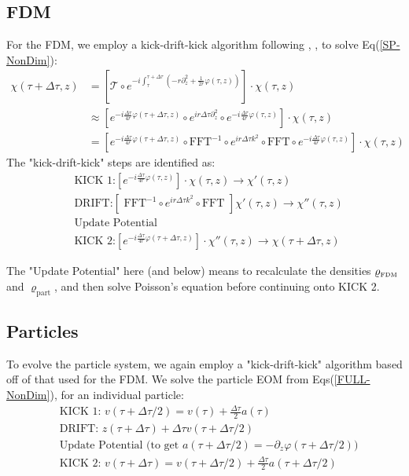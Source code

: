 \documentclass{book}
\newcommand{\pd}{\partial}
\begin{document}
\subsection{FDM}
For the FDM, we employ a kick-drift-kick algorithm following \cite{Edwards_2018}, \cite{May&Springel_2021}, to solve Eq(\ref{SP-NonDim}):
\begin{align}
    \chi(\tau+\Delta \tau,z) & = \left[\mathcal{T} \circ e^{-i \int_\tau^{\tau+\Delta\tau} \left(-r \pd_z^2 + \frac{1}{2r}\varphi(\tau,z)\right) } \right]\cdot \chi(\tau,z) \\
    &  \approx  \left[ e^{-i\frac{\Delta\tau}{4r}\varphi(\tau+\Delta\tau,z)} \circ e^{ir\Delta\tau \pd_z^2}\circ e^{-i\frac{\Delta\tau}{4r}\varphi(\tau,z)} \right] \cdot \chi(\tau,z)\\
    & = \left[e^{-i\frac{\Delta\tau}{4r}\varphi(\tau+\Delta\tau,z)} \circ \text{FFT}^{-1}\circ e^{ir\Delta\tau k^2}\circ \text{FFT}\circ e^{-i\frac{\Delta\tau}{4r}\varphi(\tau,z)} \right] \cdot \chi(\tau,z)
\end{align}
The "kick-drift-kick" steps are identified as:
\begin{align*}
    & \text{KICK 1:}  \left[ e^{-i\frac{\Delta\tau}{4r}\varphi(\tau,z)}\right] \cdot \chi(\tau,z) \rightarrow \chi'(\tau,z) \\
    &\text{DRIFT:}  \left[\text{ FFT}^{-1}\circ e^{ir\Delta\tau k^2}\circ \text{FFT } \right] \chi'(\tau,z) \rightarrow \chi''(\tau,z) \\
    &\text{Update Potential} \\
    &\text{KICK 2:}  \left[e^{-i\frac{\Delta\tau}{4r}\varphi(\tau+\Delta\tau,z)} \right]\cdot \chi''(\tau,z) \rightarrow \chi(\tau+\Delta\tau,z)
\end{align*}

The "Update Potential" here (and below) means to recalculate the densities $\varrho_\text{\tiny{FDM}}$ and $\varrho_\text{part}$, and then solve Poisson's equation before continuing onto KICK 2.
\subsection{Particles} To evolve the particle system, we again employ a "kick-drift-kick" algorithm based off of that used for the FDM. We solve the particle EOM from Eqs(\ref{FULL-NonDim}), for an individual particle:
\begin{align*}
&\text{KICK 1: } v({\tau+\Delta\tau/2}) = v(\tau) + \frac{\Delta\tau}{2}a(\tau)\\
&\text{DRIFT: } z({\tau+\Delta\tau})+ \Delta\tau v({\tau+\Delta\tau/2})\\
&\text{Update Potential (to get $a({\tau+\Delta\tau/2}) = -\pd_z \varphi({\tau+\Delta\tau/2})$})\\
&\text{KICK 2: } v({\tau+\Delta\tau}) = v({\tau+\Delta\tau/2}) + \frac{\Delta\tau}{2}a({\tau+\Delta\tau/2})\\
\end{align*}
\end{document}
